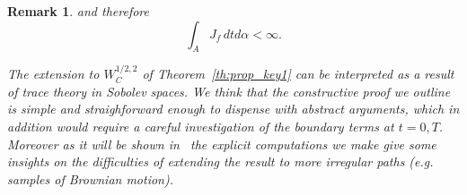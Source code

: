 \documentclass{article}
\newtheorem{corollary}[theorem]{Corollary}
\newtheorem{remark}[theorem]{Remark}
\begin{document}
\begin{remark}

and therefore
\begin{equation*}
\int_{A}J_{f}\,dtd\alpha <\infty .
\end{equation*}


The extension to $W^{1/2,2}_C$ of Theorem~\ref{th:prop_key1} can be
interpreted as a result of trace theory in Sobolev spaces.  
We think that the constructive proof we outline
is simple and straighforward enough to dispense with abstract
arguments, which in addition would require a careful investigation of
the boundary terms at $t=0,T$. 
Moreover as it will be shown in~\cite{GubWIP} the explicit
computations we make give some insights on the difficulties of
extending the result to more irregular paths (e.g. samples of
Brownian motion).
\end{remark}
\end{document}
